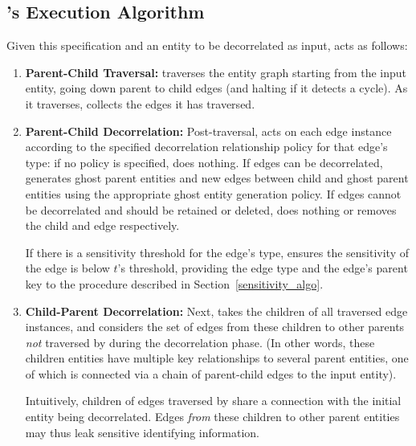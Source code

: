 \subsection{\sys's Execution Algorithm}


Given this specification and an entity to be decorrelated as input, \sys acts as follows:
\begin{enumerate}
    \item \textbf{Parent-Child Traversal:} \sys traverses the entity graph starting from the input entity,
        going down parent to child edges (and halting if it detects a cycle).  As it traverses,
        \sys collects the edges it has traversed. 
    
    \item \textbf{Parent-Child Decorrelation:} Post-traversal, \sys acts on each edge instance
        according to the specified decorrelation relationship policy for that edge's type: if no
        policy is specified, \sys does nothing. If edges can be decorrelated, \sys generates
        ghost parent entities and new edges between child and ghost parent entities using the
        appropriate ghost entity generation policy. If edges cannot be decorrelated and should be
        retained or deleted, \sys does nothing or removes the child and edge respectively. 
    
        If there is a sensitivity threshold for the edge's type, \sys ensures the
        sensitivity of the edge is below $t$'s threshold, providing the edge type and the edge's
        parent key to the procedure described in Section~\ref{sensitivity_algo}. 

    \item \textbf{Child-Parent Decorrelation:} Next, \sys takes the children of all traversed edge
        instances, and considers the set of edges from these children to other parents
        \emph{not} traversed by \sys during the decorrelation phase. (In other words, these
        children entities have multiple key relationships to several parent entities, one of
        which is connected via a chain of parent-child edges to the input entity).

        Intuitively, children of edges traversed by \sys share a connection with the initial
        entity being decorrelated. Edges \emph{from} these children to other parent entities may
        thus leak sensitive identifying information. 


\end{enumerate}
